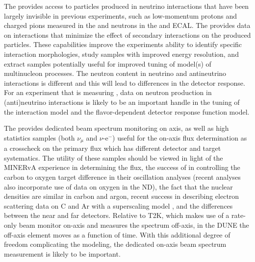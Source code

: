 The    provides access to particles produced in neutrino interactions that have been largely invisible in previous experiments, such as low-momentum protons and charged pions measured in the  and neutrons in the  and ECAL. The  provides data on interactions that minimize the effect of secondary interactions on the produced particles.  These capabilities improve the experiments ability to identify specific interaction morphologies, study samples with improved energy resolution, and extract samples potentially useful for improved tuning of model(s) of multinucleon processes. The neutron content in neutrino and antineutrino interactions is different and this will lead to differences in the detector response. For an experiment that is measuring , data on neutron production in (anti)neutrino interactions is likely to be an important handle in the tuning of the interaction model and the flavor-dependent detector response function model.


The  provides dedicated beam spectrum monitoring on axis, as well as high statistics samples (both $\nu_{\mu}$  and $\nu$-e$^{-}$) useful for the on-axis flux determination as a crosscheck on the primary flux which has different detector and target systematics.  The utility of these samples should be viewed in light of the MINERvA experience in determining the  flux, the success of  in controlling the carbon to oxygen target difference in their oscillation analyses (recent analyses also incorporate use of data on oxygen in the ND), the fact that the nuclear densities are similar in carbon and argon, recent success in describing electron scattering data on C and Ar with a superscaling model \cite{Barbaro:2019vsr}, and the differences between the near and far  detectors.  Relative to T2K, which makes use of a rate-only beam monitor on-axis and measures the spectrum off-axis, in the DUNE  the off-axis element moves as a function of time.  With this additional degree of freedom complicating the modeling, the dedicated on-axis beam spectrum measurement is likely to be important.

